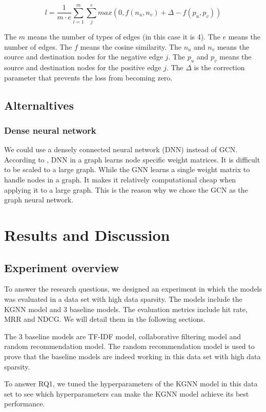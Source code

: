 \documentclass[11pt,twoside]{report}
\begin{document}
\begin{equation}
    l=\frac{1}{m\cdot{e}}\sum_{i=1}^{m}\sum_{j}^{e} max(0, f(n_u, n_v)+\Delta-f(p_u, p_v))
    \label{eq:loss_function}
\end{equation}

The $m$ means the number of types of edges (in this case it is 4). The $e$ means the number of edges. The $f$ means the cosine similarity. The $n_u$ and $n_v$ means the source and destination nodes for the negative edge $j$. The $p_u$ and $p_v$ means the source and destination nodes for the positive edge $j$. The $\Delta$ is the correction parameter that prevents the loss from becoming zero.

\section{Alternaltives}
\subsection{Dense neural network}
We could use a densely connected neural network (DNN) instead of GCN. According to \cite{kipf_semi-supervised_2017}, DNN in a graph learns node specific weight matrices. It is difficult to be scaled to a large graph. While the GNN learns a single weight matrix to handle nodes in a graph. It makes it relatively computational cheap when applying it to a large graph. This is the reason why we chose the GCN as the graph neural network.

\chapter{Results and Discussion}
\section{Experiment overview}
To answer the research questions, we designed an experiment in which the models was evaluated in a data set with high data sparsity. The models include the KGNN model and 3 baseline models. The evaluation metrics include hit rate, MRR and NDCG. We will detail them in the following sections.

The 3 baseline models are TF-IDF model, collaborative filtering model and random recommendation model. The random recommendation model is used to prove that the baseline models are indeed working in this data set with high data sparsity.

To answer RQ1, we tuned the hyperparameters of the KGNN model in this data set to see which hyperparameters can make the KGNN model achieve its best performance.
\end{document}
